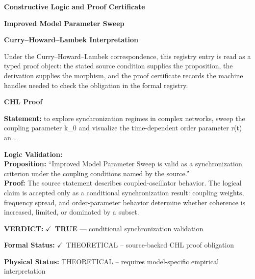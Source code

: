 \clearpage
\begingroup\tzpsupportsetup
\noindent\textbf{\fontsize{10.8pt}{12.8pt}\selectfont [ID 0144] Constructive Logic and Proof Certificate}\par
\noindent\textbf{\fontsize{10pt}{12pt}\selectfont Improved Model Parameter Sweep}\par
\vspace{0.45em}
\begingroup
\footnotesize
\setlength{\parskip}{0.22em}
\setlength{\parindent}{0pt}
\noindent\textbf{Curry--Howard--Lambek Interpretation}\par
Under the Curry--Howard--Lambek correspondence, this registry entry is read as a typed proof
object: the stated source condition supplies the proposition, the derivation supplies the
morphism, and the proof certificate records the machine handles needed to check the obligation
in the formal registry.

\vspace{0.45em}
\noindent\textbf{CHL Proof}\par
\textbf{Statement:} to explore synchronization regimes in complex networks, sweep the coupling parameter
k\_0 and visualize the time-dependent order parameter r(t) an...

\textbf{Logic Validation:}\\
\textbf{Proposition:} ``Improved Model Parameter Sweep is valid as a synchronization criterion under the
coupling conditions named by the source.''\\
\textbf{Proof:} The source statement describes coupled-oscillator behavior. The logical claim is
accepted only as a conditional synchronization result: coupling weights, frequency
spread, and order-parameter behavior determine whether coherence is increased, limited,
or dominated by a subset.

\textbf{VERDICT:} \ensuremath{\checkmark}\ \textbf{TRUE} --- conditional synchronization validation

\textbf{Formal Status:} \ensuremath{\checkmark}\ THEORETICAL -- source-backed CHL proof obligation

\textbf{Physical Status:} THEORETICAL -- requires model-specific empirical interpretation
\par\vspace{0.45em}
\par
\ifTZPDarkEdition
{}
\fi
\endgroup
\endgroup
